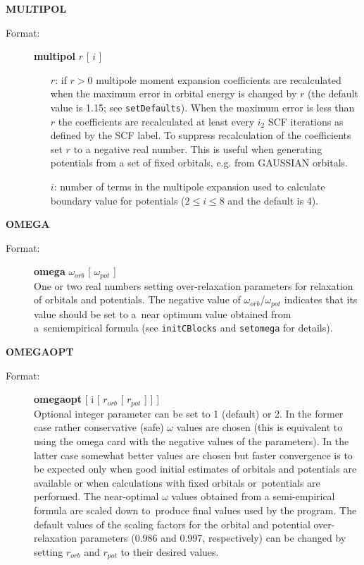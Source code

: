 \documentclass[12pt,a4paper]{article}
\newcommand{\ft}[1]{\texttt{#1}}
\begin{document}
\begin{description}
\begin{description}
\begin{itemize}
\end{itemize}
\end{description}


\item \textbf{MULTIPOL}
\begin{description}
\item[Format:] \textbf{multipol} $r$ [ $i$ ]
\begin{itemize}
\item[$r$:] if $r>0$ multipole moment expansion coefficients are recalculated when the
  maximum error in orbital energy is changed by $r$ (the default value is 1.15; see
  \ft{setDefaults}). When the maximum error is less than $r$ the coefficients are
  recalculated at least every $i_2$ SCF iterations as defined by the SCF label. To
  suppress recalculation of the coefficients set $r$ to a negative real number. This is
  useful when generating potentials from a set of fixed orbitals, e.g. from GAUSSIAN
  orbitals.

\item[$i$:] number of terms in the multipole expansion used to calculate
  boundary value for potentials ($2 \le i\le 8$ and the default is 4).
\end{itemize}
\end{description}


\item \textbf{OMEGA}
\begin{description}
\item[Format:] \textbf{omega} $\omega_{orb}$ [ $\omega_{pot}$ ] \\ One or two real numbers
  setting over-relaxation parameters for relaxation of orbitals and potentials. The
  negative value of $\omega_{orb}$/$\omega_{pot}$ indicates that its value should be
  set to a~near optimum value obtained from a~semiempirical formula (see \ft{initCBlocks}
  and \ft{setomega} for details).
\end{description}

\item \textbf{OMEGAOPT}
\begin{description}
\item[Format:] \textbf{omegaopt} [ i [ $r_{orb}$ [ $r_{pot}$ ] ] ] \\ Optional integer
  parameter can be set to 1 (default) or 2. In the former case rather conservative (safe)
  $\omega$ values are chosen (this is equivalent to using the omega card with the negative
  values of the parameters). In the latter case somewhat better values are chosen but
  faster convergence is to be expected only when good initial estimates of orbitals and
  potentials are available or when calculations with fixed orbitals or~potentials are
  performed. The near-optimal $\omega$ values obtained from a semi-empirical formula are
  scaled down to~produce final values used by the program. The default values of the
  scaling factors for the orbital and potential over-relaxation parameters (0.986 and
  0.997, respectively) can be changed by setting $r_{orb}$ and $r_{pot}$ to their desired
  values.
\end{description}


\end{description}
\end{document}
